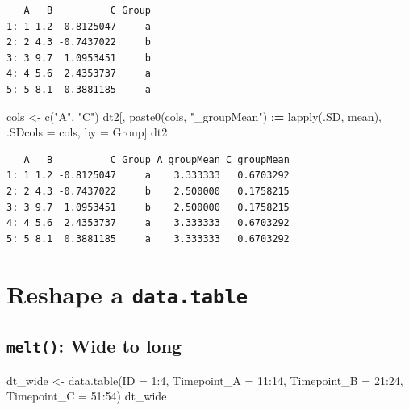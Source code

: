 \documentclass[
]{book}
\newenvironment{Shaded}{\begin{snugshade}}{\end{snugshade}}
\newcommand{\AttributeTok}[1]{\textcolor[rgb]{0.77,0.63,0.00}{#1}}
\newcommand{\DecValTok}[1]{\textcolor[rgb]{0.00,0.00,0.81}{#1}}
\newcommand{\ErrorTok}[1]{\textcolor[rgb]{0.64,0.00,0.00}{\textbf{#1}}}
\newcommand{\FunctionTok}[1]{\textcolor[rgb]{0.00,0.00,0.00}{#1}}
\newcommand{\NormalTok}[1]{#1}
\newcommand{\OtherTok}[1]{\textcolor[rgb]{0.56,0.35,0.01}{#1}}
\newcommand{\SpecialCharTok}[1]{\textcolor[rgb]{0.00,0.00,0.00}{#1}}
\newcommand{\StringTok}[1]{\textcolor[rgb]{0.31,0.60,0.02}{#1}}
\begin{document}
\begin{verbatim}
   A   B          C Group
1: 1 1.2 -0.8125047     a
2: 2 4.3 -0.7437022     b
3: 3 9.7  1.0953451     b
4: 4 5.6  2.4353737     a
5: 5 8.1  0.3881185     a
\end{verbatim}

\begin{Shaded}
\begin{Highlighting}[]
\NormalTok{cols }\OtherTok{\textless{}{-}} \FunctionTok{c}\NormalTok{(}\StringTok{"A"}\NormalTok{, }\StringTok{"C"}\NormalTok{)}
\NormalTok{dt2[, }\FunctionTok{paste0}\NormalTok{(cols, }\StringTok{"\_groupMean"}\NormalTok{) }\SpecialCharTok{:}\ErrorTok{=} \FunctionTok{lapply}\NormalTok{(.SD, mean), .SDcols }\OtherTok{=}\NormalTok{ cols, by }\OtherTok{=}\NormalTok{ Group]}
\NormalTok{dt2}
\end{Highlighting}
\end{Shaded}

\begin{verbatim}
   A   B          C Group A_groupMean C_groupMean
1: 1 1.2 -0.8125047     a    3.333333   0.6703292
2: 2 4.3 -0.7437022     b    2.500000   0.1758215
3: 3 9.7  1.0953451     b    2.500000   0.1758215
4: 4 5.6  2.4353737     a    3.333333   0.6703292
5: 5 8.1  0.3881185     a    3.333333   0.6703292
\end{verbatim}

\hypertarget{reshape-a-data.table}{%
\section{\texorpdfstring{Reshape a \texttt{data.table}}{Reshape a data.table}}\label{reshape-a-data.table}}

\hypertarget{melt-wide-to-long}{%
\subsection{\texorpdfstring{\texttt{melt()}: Wide to long}{melt(): Wide to long}}\label{melt-wide-to-long}}

\begin{Shaded}
\begin{Highlighting}[]
\NormalTok{dt\_wide }\OtherTok{\textless{}{-}} \FunctionTok{data.table}\NormalTok{(}\AttributeTok{ID =} \DecValTok{1}\SpecialCharTok{:}\DecValTok{4}\NormalTok{, }\AttributeTok{Timepoint\_A =} \DecValTok{11}\SpecialCharTok{:}\DecValTok{14}\NormalTok{,}
                      \AttributeTok{Timepoint\_B =} \DecValTok{21}\SpecialCharTok{:}\DecValTok{24}\NormalTok{, }\AttributeTok{Timepoint\_C =} \DecValTok{51}\SpecialCharTok{:}\DecValTok{54}\NormalTok{)}
\NormalTok{dt\_wide}
\end{Highlighting}
\end{Shaded}
\end{document}
